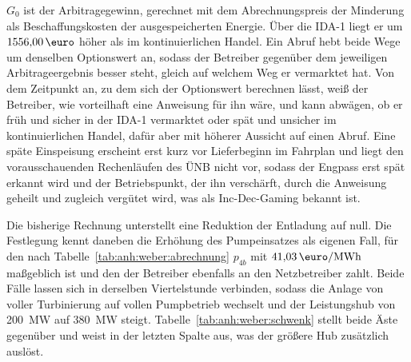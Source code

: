 $G_0$ ist der Arbitragegewinn, gerechnet mit dem Abrechnungspreis der Minderung als Beschaffungskosten der ausgespeicherten Energie. Über die \ac{IDA-1} liegt er um $1556{,}00\,\text{\euro}$ höher als im kontinuierlichen Handel. Ein Abruf hebt beide Wege um denselben Optionswert an, sodass der Betreiber gegenüber dem jeweiligen Arbitrageergebnis besser steht, gleich auf welchem Weg er vermarktet hat. Von dem Zeitpunkt an, zu dem sich der Optionswert berechnen lässt, weiß der Betreiber, wie vorteilhaft eine Anweisung für ihn wäre, und kann abwägen, ob er früh und sicher in der \ac{IDA-1} vermarktet oder spät und unsicher im kontinuierlichen Handel, dafür aber mit höherer Aussicht auf einen Abruf. Eine späte Einspeisung erscheint erst kurz vor Lieferbeginn im Fahrplan und liegt den vorausschauenden Rechenläufen des \ac{ÜNB} nicht vor, sodass der Engpass erst spät erkannt wird und der Betriebspunkt, der ihn verschärft, durch die Anweisung geheilt und zugleich vergütet wird, was als Inc-Dec-Gaming bekannt ist.

Die bisherige Rechnung unterstellt eine Reduktion der Entladung auf null. Die Festlegung kennt daneben die Erhöhung des Pumpeinsatzes als eigenen Fall, für den nach Tabelle~\ref{tab:anh:weber:abrechnung} $p_{4b}$ mit $41{,}03\,\si{\text{\euro}\per MWh}$ maßgeblich ist und den der Betreiber ebenfalls an den Netzbetreiber zahlt. Beide Fälle lassen sich in derselben Viertelstunde verbinden, sodass die Anlage von voller Turbinierung auf vollen Pumpbetrieb wechselt und der Leistungshub von \SI{200}{\mega\watt} auf \SI{380}{\mega\watt} steigt. Tabelle~\ref{tab:anh:weber:schwenk} stellt beide Äste gegenüber und weist in der letzten Spalte aus, was der größere Hub zusätzlich auslöst.

